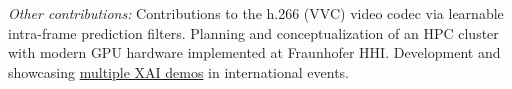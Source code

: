 {{{            \vstep

            \emph{Other contributions:}
            Contributions to the h.266 (VVC) video codec via learnable intra-frame prediction filters.
            Planning and conceptualization of an HPC cluster with modern GPU hardware implemented at Fraunhofer HHI.
            Development and showcasing
            \href{https://lrpserver.hhi.fraunhofer.de/}{multiple XAI demos}
            in international events.

            \vstep


        }
    }
}


